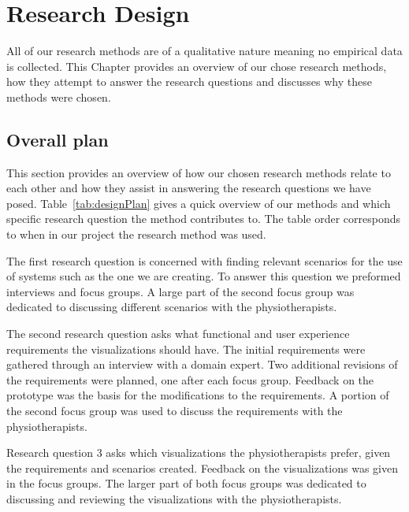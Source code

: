 \chapter{Research Design}
\label{ch:researchDesign}
All of our research methods are of a qualitative nature meaning no empirical data is collected. This Chapter provides an overview of our chose research methods, how they attempt to answer the research questions and discusses why these methods were chosen.

\section{Overall plan}
\label{sec:overview}
This section provides an overview of how our chosen research methods relate to each other and how they assist in answering the research questions we have posed. Table~\ref{tab:designPlan} gives a quick overview of our methods and which specific research question the method contributes to. The table order corresponds to when in our project the research method was used.

The first research question is concerned with finding relevant scenarios for the use of systems such as the one we are creating. To answer this question we preformed interviews and focus groups. A large part of the second focus group was dedicated to discussing different scenarios with the physiotherapists.

The second research question asks what functional and user experience requirements the visualizations should have. The initial requirements were gathered through an interview with a domain expert. Two additional revisions of the requirements were planned, one after each focus group. Feedback on the prototype was the basis for the modifications to the requirements. A portion of the second focus group was used to discuss the requirements with the physiotherapists.

Research question 3 asks which visualizations the physiotherapists prefer, given the requirements and scenarios created. Feedback on the visualizations was given in the focus groups. The larger part of both focus groups was dedicated to discussing and reviewing the visualizations with the physiotherapists. 

